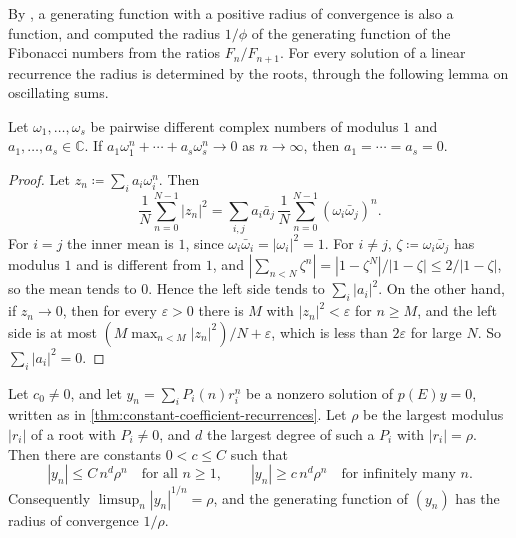 By , a generating function with a positive radius of convergence is also a function, and  computed the radius $1/\phi$ of the generating function of the Fibonacci numbers from the ratios $F_n/F_{n+1}$. For every solution of a linear recurrence the radius is determined by the roots, through the following lemma on oscillating sums.

\begin{lemma}
\label{lem:unimodular-means}
Let $\omega_1,\ldots,\omega_s$ be pairwise different complex numbers of modulus $1$ and $a_1,\ldots,a_s\in\mathbb C$. If $a_1\omega_1^n+\cdots+a_s\omega_s^n\to0$ as $n\to\infty$, then $a_1=\cdots=a_s=0$.
\end{lemma}

\begin{proof}
Let $z_n\coloneqq\sum_ia_i\omega_i^n$. Then
\[
\frac1N\sum_{n=0}^{N-1}|z_n|^2=\sum_{i,j}a_i\bar a_j\,\frac1N\sum_{n=0}^{N-1}(\omega_i\bar\omega_j)^n .
\]
For $i=j$ the inner mean is $1$, since $\omega_i\bar\omega_i=|\omega_i|^2=1$. For $i\ne j$, $\zeta\coloneqq\omega_i\bar\omega_j$ has modulus $1$ and is different from $1$, and $|\sum_{n<N}\zeta^n|=|1-\zeta^N|/|1-\zeta|\le2/|1-\zeta|$, so the mean tends to $0$. Hence the left side tends to $\sum_i|a_i|^2$. On the other hand, if $z_n\to0$, then for every $\varepsilon>0$ there is $M$ with $|z_n|^2<\varepsilon$ for $n\ge M$, and the left side is at most $(M\max_{n<M}|z_n|^2)/N+\varepsilon$, which is less than $2\varepsilon$ for large $N$. So $\sum_i|a_i|^2=0$.
\end{proof}

\begin{proposition}
\label{prop:recurrence-growth}
Let $c_0\ne0$, and let $y_n=\sum_iP_i(n)r_i^n$ be a nonzero solution of $p(E)y=0$, written as in \cref{thm:constant-coefficient-recurrences}. Let $\rho$ be the largest modulus $|r_i|$ of a root with $P_i\ne0$, and $d$ the largest degree of such a $P_i$ with $|r_i|=\rho$. Then there are constants $0<c\le C$ such that
\[
|y_n|\le C\,n^d\rho^n\quad\text{for all }n\ge1,\qquad|y_n|\ge c\,n^d\rho^n\quad\text{for infinitely many }n .
\]
Consequently $\limsup_n|y_n|^{1/n}=\rho$, and the generating function of $(y_n)$ has the radius of convergence $1/\rho$.
\end{proposition}


